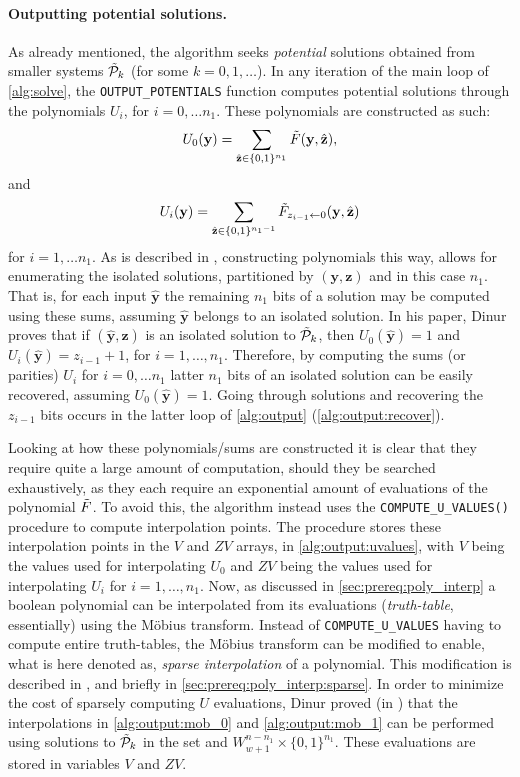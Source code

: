 \paragraph{Outputting potential solutions.} As already mentioned, the algorithm seeks \textit{potential} solutions obtained from smaller systems $\Tilde{\mathcal{P}}_k$ (for some $k = 0, 1,\dots $). In any iteration of the main loop of \cref{alg:solve}, the \texttt{OUTPUT\_POTENTIALS} function computes potential solutions through the polynomials $U_i$, for $i = 0, \dots n_1$. These polynomials are constructed as such: 
$$
U_0(\mathbf{y}) = \sum_{\hat{\mathbf{z}} \in \{0,1\}^{n_1}} \Tilde{F}(\mathbf{y}, \hat{\mathbf{z}}),
$$
and
$$
U_i(\mathbf{y}) = \sum_{\hat{\mathbf{z}} \in \{0,1\}^{n_1 - 1}} \Tilde{F}_{z_{i - 1} \leftarrow 0}(\mathbf{y}, \hat{\mathbf{z}})
$$
for $i = 1, \dots n_1$. As is described in \cite{eurocrypt-2021-30841}, constructing polynomials this way, allows for enumerating the isolated solutions, partitioned by $(\mathbf{y},\mathbf{z})$ and in this case $n_1$. That is, for each input $\hat{\mathbf{y}}$ the remaining $n_1$ bits of a solution may be computed using these sums, assuming $\hat{\mathbf{y}}$ belongs to an isolated solution. In his paper, Dinur proves that if $(\hat{\mathbf{y}}, \hat{\mathbf{z}})$ is an isolated solution to $\Tilde{\mathcal{P}}_k$, then $U_0(\hat{\mathbf{y}}) = 1$ and $U_i(\hat{\mathbf{y}}) = z_{i - 1} + 1$, for $i = 1, \dots, n_1$. Therefore, by computing the sums (or parities) $U_i$ for $i = 0, \dots n_1$ latter $n_1$ bits of an isolated solution can be easily recovered, assuming $U_0(\hat{\mathbf{y}}) = 1$. Going through solutions and recovering the $z_{i - 1}$ bits occurs in the latter loop of \cref{alg:output} (\cref{alg:output:recover}).

Looking at how these polynomials/sums are constructed it is clear that they require quite a large amount of computation, should they be searched exhaustively, as they each require an exponential amount of evaluations of the polynomial $\Tilde{F}$. To avoid this, the algorithm instead uses the \texttt{COMPUTE\_U\_VALUES()} procedure to compute interpolation points. The procedure stores these interpolation points in the $V$ and $ZV$ arrays, in \cref{alg:output:uvalues}, with $V$ being the values used for interpolating $U_0$ and $ZV$ being the values used for interpolating $U_i$ for $i = 1, \dots, n_1$. Now, as discussed in \cref{sec:prereq:poly_interp} a boolean polynomial can be interpolated from its evaluations (\textit{truth-table}, essentially) using the Möbius transform. Instead of \texttt{COMPUTE\_U\_VALUES} having to compute entire truth-tables, the Möbius transform can be modified to enable, what is here denoted as, \textit{sparse interpolation} of a polynomial. This modification is described in \cite{fse-2011-23547}, and briefly in \cref{sec:prereq:poly_interp:sparse}. In order to minimize the cost of sparsely computing $U$ evaluations, Dinur proved (in \cite{eurocrypt-2021-30841}) that the interpolations in \cref{alg:output:mob_0} and \cref{alg:output:mob_1} can be performed using solutions to $\Tilde{\mathcal{P}}_k$ in the set and $W^{n - n_1}_{w + 1} \times \{0, 1\}^{n_1}$. These evaluations are stored in variables $V$ and $ZV$.

